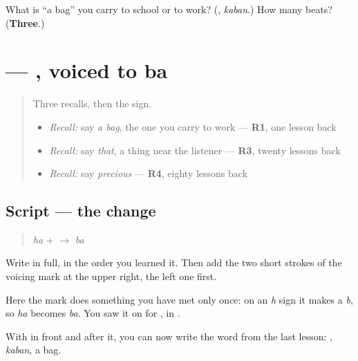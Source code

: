 \begin{tcolorbox}[breakable,colback=teal!4,colframe=teal!35!black,title={Before you move on}]
What is \textquotedblleft{}a bag\textquotedblright{} you carry to school or to work? (\textbf{}, \emph{kaban}.) How many beats? (\textbf{Three}.)
\end{tcolorbox}
\section[\texorpdfstring{\ja{ば} (ba)}{ば (ba)}]{ — , voiced to ba}

\label{lesson:JA-W134-ba}



\begin{quote}
Three recalls, then the sign.

\begin{itemize}
\raggedright
  \item \emph{Recall:} say \emph{a bag}, the one you carry to work — \textbf{R1}, one lesson back
  \item \emph{Recall:} say \emph{that}, a thing near the listener — \textbf{R3}, twenty lessons back
  \item \emph{Recall:} say \emph{precious} — \textbf{R4}, eighty lessons back
\end{itemize}
\end{quote}

\subsection*{Script — the change}

\begin{quote}
\textbf{} \emph{ha} + \textbf{} $\to$ \textbf{} \emph{ba}
\end{quote}

Write \textbf{} in full, in the order you learned it. Then add the two short strokes of the voicing mark at the upper right, the left one first.

Here the mark does something you have met only once: on an \emph{h} sign it makes a \emph{b}, so \emph{ha} becomes \emph{ba}. You saw it on \textbf{} for \textbf{}, in \textbf{}.

With \textbf{} in front and \textbf{} after it, you can now write the word from the last lesson: \textbf{}, \emph{kaban}, a bag.

